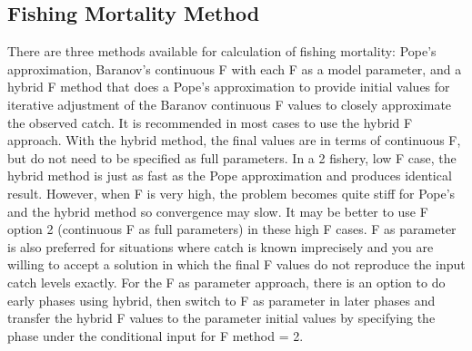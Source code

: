 \subsection{Fishing Mortality Method}
There are  three methods available for calculation of fishing mortality: Pope's approximation, Baranov's continuous F with each F as a model parameter, and a hybrid F method that does a Pope's approximation to provide initial values for iterative adjustment of the Baranov continuous F values to closely approximate the observed catch.  It is recommended in most cases to use the hybrid F approach. With the hybrid method, the final values are in terms of continuous F, but do not need to be specified as full parameters. In a 2 fishery, low F case, the hybrid method is just as fast as the Pope approximation and produces identical result.  However, when F is very high, the problem becomes quite stiff for Pope's and the hybrid method so convergence may slow. It may  be better to use F option 2 (continuous F as full parameters) in these high F cases. F as parameter is also preferred for situations where catch is known imprecisely and you are willing to accept a solution in which the final F values do not reproduce the input catch levels exactly. For the F as parameter approach, there is an option to do early phases using hybrid, then switch to F as parameter in later phases and transfer the hybrid F values to the parameter initial values by specifying the phase under the conditional input for F method = 2. 

